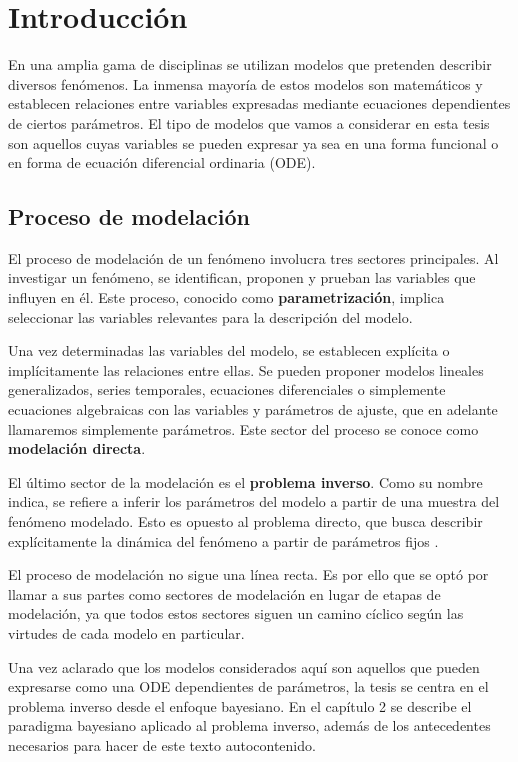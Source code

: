 \chapter{Introducción}

En una amplia gama de disciplinas se utilizan modelos que pretenden describir diversos fenómenos. La inmensa mayoría de estos modelos son matemáticos y establecen relaciones entre variables expresadas mediante ecuaciones dependientes de ciertos parámetros. El tipo de modelos que vamos a considerar en esta tesis son aquellos cuyas variables se pueden expresar ya sea en una forma funcional o en forma de ecuación diferencial ordinaria (ODE).

\section{Proceso de modelación}

El proceso de modelación de un fenómeno involucra tres sectores principales. Al investigar un fenómeno, se identifican, proponen y prueban las variables que influyen en él. Este proceso, conocido como \textbf{parametrización}, implica seleccionar las variables relevantes para la descripción del modelo.

Una vez determinadas las variables del modelo, se establecen explícita o implícitamente las relaciones entre ellas. Se pueden proponer modelos lineales generalizados, series temporales, ecuaciones diferenciales o simplemente ecuaciones algebraicas con las variables y parámetros de ajuste, que en adelante llamaremos simplemente parámetros. Este sector del proceso se conoce como \textbf{modelación directa}.

El último sector de la modelación es el \textbf{problema inverso}. Como su nombre indica, se refiere a inferir los parámetros del modelo a partir de una muestra del fenómeno modelado. Esto es opuesto al problema directo, que busca describir explícitamente la dinámica del fenómeno a partir de parámetros fijos \citep{calvetti2018inverse}. 

El proceso de modelación no sigue una línea recta. Es por ello que se optó por llamar a sus partes como sectores de modelación en lugar de etapas de modelación, ya que todos estos sectores siguen un camino cíclico según las virtudes de cada modelo en particular. 

Una vez aclarado que los modelos considerados aquí son aquellos que pueden expresarse como una ODE dependientes de parámetros, la tesis se centra en el problema inverso desde el enfoque bayesiano. En el capítulo 2 se describe el paradigma bayesiano aplicado al problema inverso, además de los antecedentes necesarios para hacer de este texto autocontenido. 

